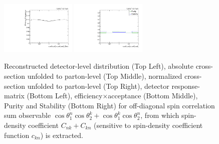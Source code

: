 \begin{figure}[htb]
\begin{center}
 \includegraphics[width=0.32\textwidth]{fig_fullRun2UL/unfolding/combined/TotEff_c_Pnk.pdf}
 \includegraphics[width=0.32\textwidth]{fig_fullRun2UL/unfolding/combined/PurStab_c_Pnk.pdf} \\
\caption{Reconstructed detector-level distribution (Top Left), absolute cross-section unfolded to parton-level (Top Middle), normalized cross-section unfolded to parton-level (Top Right), detector response-matrix (Bottom Left), efficiency$\times$acceptance (Bottom Middle), Purity and Stability (Bottom Right) for off-diagonal spin correlation sum observable $\cos\theta_{1}^{n}\cos\theta_{2}^{k}+\cos\theta_{1}^{k}\cos\theta_{2}^{n}$, from which spin-density coefficient $C_{nk}+C_{kn}$ (sensitive to spin-density coefficient function $c_{k n}$) is extracted.}
\label{fig:c_Pnk}
\end{center}
\end{figure}
\clearpage
